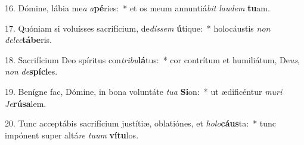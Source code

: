 16. Dómine, lábia me\textit{a} \textit{a}\textbf{pé}ries:~*  et os meum annuntiá\textit{bit} \textit{lau}\textit{dem} \textbf{tu}am.\

17. Quóniam si voluísses sacrifícium, de\textit{dís}\textit{sem} \textbf{ú}tique:~*  holocáustis \textit{non} \textit{de}\textit{lec}\textbf{tá}\textbf{be}ris.\

18. Sacrifícium Deo spíritus con\textit{tri}\textit{bu}\textbf{lá}tus:~*  cor contrítum et humiliátum, De\textit{us}, \textit{non} \textit{de}\textbf{spí}\textbf{ci}es.\

19. Benígne fac, Dómine, in bona voluntáte \textit{tu}\textit{a} \textbf{Si}on:~*  ut ædificéntur \textit{mu}\textit{ri} \textit{Je}\textbf{rú}\textbf{sa}lem.\

20. Tunc acceptábis sacrifícium justítiæ, oblatiónes, et \textit{ho}\textit{lo}\textbf{cáus}ta:~*  tunc impónent super altá\textit{re} \textit{tu}\textit{um} \textbf{ví}\textbf{tu}los.\

